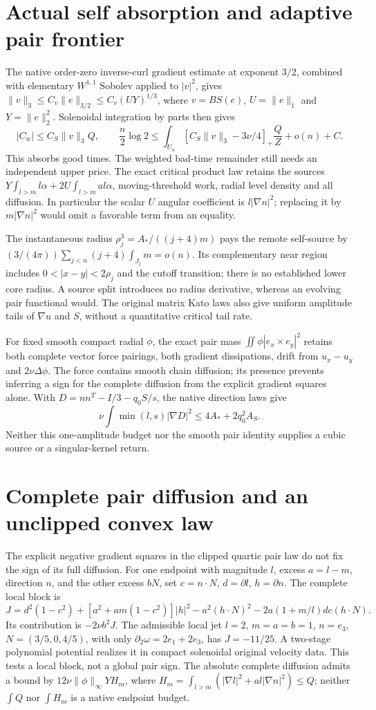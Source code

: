\documentclass[11pt]{article}
\begin{document}
\section{Actual self absorption and adaptive pair frontier}
The native order-zero inverse-curl gradient estimate at exponent $3/2$,
combined with elementary $W^{1,1}$ Sobolev applied to $|v|^2$, gives
$\|v\|_3\le C_v\|e\|_{3/2}\le C_v(UY)^{1/3}$, where
$v=BS(e)$, $U=\|e\|_1$ and $Y=\|e\|_2^2$.
Solenoidal integration by parts then gives
\[
 |C_w|\le C_S\|v\|_3Q,\qquad
 \frac n2\log2\le\int_{U_n}
 [C_S\|v\|_3-3\nu/4]_+\frac QZ+o(n)+C.
\]
This absorbs good times. The weighted bad-time remainder still needs an
independent upper price. The exact critical product law retains the
sources $Y\int_{l>m}l\alpha+2U\int_{l>m}al\alpha$, moving-threshold
work, radial level density and all diffusion. In particular the scalar
$U$ angular coefficient is $l|\nabla n|^2$; replacing it by $m|\nabla n|^2$
would omit a favorable term from an equality.

The instantaneous radius $\rho_j^3=A_*/((j+4)m)$ pays the remote
self-source by $(3/(4\pi))\sum_{j<n}(j+4)\int_{J_j}m=o(n)$.
Its complementary near region includes $0<|x-y|<2\rho_j$ and the cutoff
transition; there is no established lower core radius. A source split
introduces no radius derivative, whereas an evolving pair functional would.
The original matrix Kato laws also give uniform amplitude tails of
$\nabla u$ and $S$, without a quantitative critical tail rate.

For fixed smooth compact radial $\phi$, the exact pair mass
$\iint\phi|e_x\times e_y|^2$ retains both complete vector force pairings,
both gradient dissipations, drift from $u_x-u_y$ and $2\nu\Delta\phi$.
The force contains smooth chain diffusion; its presence prevents inferring
a sign for the complete diffusion from the explicit gradient squares alone.
With $D=nn^T-I/3-q_0S/s$, the native direction laws give
\[
 \nu\int\min(l,s)|\nabla D|^2\le4A_*+2q_0^2A_S.
\]
Neither this one-amplitude budget nor the smooth pair identity supplies a
cubic source or a singular-kernel return.

\section{Complete pair diffusion and an unclipped convex law}
The explicit negative gradient squares in the clipped quartic pair law
do not fix the sign of its full diffusion. For one endpoint with magnitude
$l$, excess $a=l-m$, direction $n$, and the other excess $bN$, set
$c=n\cdot N$, $d=\partial l$, $h=\partial n$. The complete local block is
\[
 J=d^2(1-c^2)+[a^2+am(1-c^2)]|h|^2-a^2(h\cdot N)^2
       -2a(1+m/l)dc(h\cdot N).
\]
Its contribution is $-2\nu b^2J$. The admissible local jet
$l=2$, $m=a=b=1$, $n=e_3$, $N=(3/5,0,4/5)$, with only
$\partial_2\omega=2e_1+2e_3$, has $J=-11/25$.
A two-stage polynomial potential realizes it in compact solenoidal
original velocity data. This tests a local block, not a global pair sign.
The absolute complete diffusion admits a bound by
$12\nu\|\phi\|_\infty YH_m$, where
$H_m=\int_{l>m}(|\nabla l|^2+al|\nabla n|^2)\le Q$;
neither $\int Q$ nor $\int H_m$ is a native endpoint budget.
\end{document}
